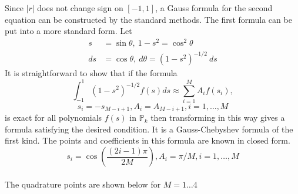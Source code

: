 \documentclass[10pt,a4paper]{letter}
\begin{document}
Since $|r|$ does not change sign on $[-1,1]$, a Gauss formula for the second equation can be constructed by the standard methods.  The first formula can be put into a more standard form. Let
\begin{align*}
s&=\sin\theta, \ 1-s^2 = \cos^2 \theta\\
ds &= \cos\theta, \ d\theta = (1-s^2)^{-1/2}\ ds
\end{align*}
It is straightforward to show that if the formula
$$\int_{-1}^1 (1-s^2)^{-1/2} f(s) ds \approx \sum_{i=1}^M A_i f(s_i),$$ $$s_i = -s_{M-i+1}, A_i = A_{M-i+1}, i=1, \dots, M$$
is exact for all polynomials $f(s)$ in $\mathbb{P}_k$ then transforming in this way gives a formula satisfying the desired condition.  It is a Gauss-Chebyshev formula of the first kind.  The points and coefficients in this formula are known in closed form.
$$s_i = \cos\left(\frac{(2i-1)\pi}{2M}\right), A_i = \pi/M, i = 1, \dots, M$$\\

The quadrature points are shown below for $M = 1 \dots 4$\\
\end{document}
